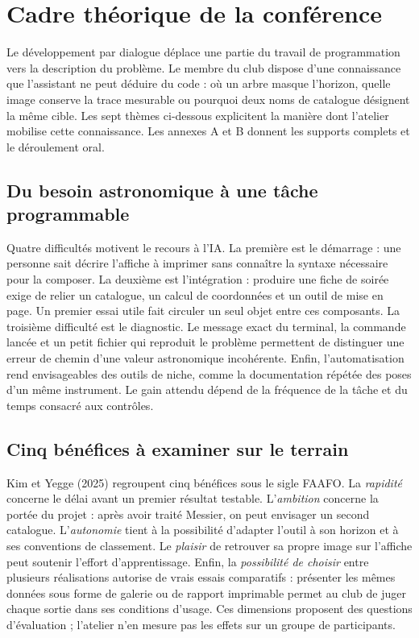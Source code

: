 \section{Cadre théorique de la conférence}
Le développement par dialogue déplace une partie du travail de programmation vers la description du problème. Le membre du club dispose d'une connaissance que l'assistant ne peut déduire du code : où un arbre masque l'horizon, quelle image conserve la trace mesurable ou pourquoi deux noms de catalogue désignent la même cible. Les sept thèmes ci-dessous explicitent la manière dont l'atelier mobilise cette connaissance. Les annexes A et B donnent les supports complets et le déroulement oral.

\subsection{Du besoin astronomique à une tâche programmable}
Quatre difficultés motivent le recours à l'IA. La première est le démarrage : une personne sait décrire l'affiche à imprimer sans connaître la syntaxe nécessaire pour la composer. La deuxième est l'intégration : produire une fiche de soirée exige de relier un catalogue, un calcul de coordonnées et un outil de mise en page. Un premier essai utile fait circuler un seul objet entre ces composants. La troisième difficulté est le diagnostic. Le message exact du terminal, la commande lancée et un petit fichier qui reproduit le problème permettent de distinguer une erreur de chemin d'une valeur astronomique incohérente. Enfin, l'automatisation rend envisageables des outils de niche, comme la documentation répétée des poses d'un même instrument. Le gain attendu dépend de la fréquence de la tâche et du temps consacré aux contrôles.

\subsection{Cinq bénéfices à examiner sur le terrain}
Kim et Yegge (2025) regroupent cinq bénéfices sous le sigle FAAFO. La \emph{rapidité} concerne le délai avant un premier résultat testable. L'\emph{ambition} concerne la portée du projet : après avoir traité Messier, on peut envisager un second catalogue. L'\emph{autonomie} tient à la possibilité d'adapter l'outil à son horizon et à ses conventions de classement. Le \emph{plaisir} de retrouver sa propre image sur l'affiche peut soutenir l'effort d'apprentissage. Enfin, la \emph{possibilité de choisir} entre plusieurs réalisations autorise de vrais essais comparatifs : présenter les mêmes données sous forme de galerie ou de rapport imprimable permet au club de juger chaque sortie dans ses conditions d'usage. Ces dimensions proposent des questions d'évaluation ; l'atelier n'en mesure pas les effets sur un groupe de participants.

